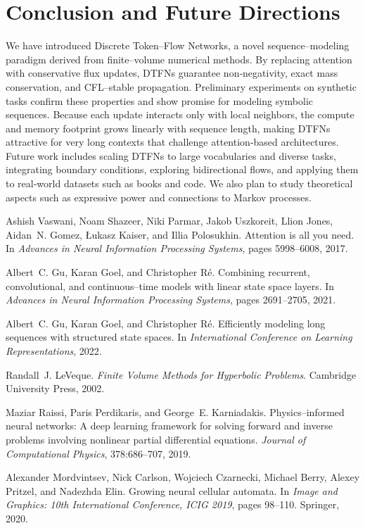 \documentclass[10pt]{article}
\begin{document}
\section{Conclusion and Future Directions}
We have introduced Discrete Token–Flow Networks, a novel sequence–modeling
paradigm derived from finite–volume numerical methods. By replacing attention
with conservative flux updates, DTFNs guarantee non‑negativity, exact mass
conservation, and CFL–stable propagation. Preliminary experiments on synthetic
tasks confirm these properties and show promise for modeling symbolic
sequences. Because each update interacts only with local neighbors, the
compute and memory footprint grows linearly with sequence length, making
DTFNs attractive for very long contexts that challenge attention‑based
architectures. Future work includes scaling DTFNs to large vocabularies
and diverse tasks, integrating boundary conditions, exploring bidirectional
flows, and applying them to real‑world datasets such as books and code.
We also plan to study theoretical aspects such as expressive power and
connections to Markov processes.


\begin{thebibliography}{10}

Ashish Vaswani, Noam Shazeer, Niki Parmar, Jakob Uszkoreit, Llion Jones,
Aidan~N. Gomez, \L{}ukasz Kaiser, and Illia Polosukhin.
\newblock Attention is all you need.
\newblock In \emph{Advances in Neural Information Processing Systems}, pages
  5998--6008, 2017.

Albert~C. Gu, Karan Goel, and Christopher R{\'e}.
\newblock Combining recurrent, convolutional, and continuous--time models with
  linear state space layers.
\newblock In \emph{Advances in Neural Information Processing Systems}, pages
  2691--2705, 2021.

Albert~C. Gu, Karan Goel, and Christopher R{\'e}.
\newblock Efficiently modeling long sequences with structured state spaces.
\newblock In \emph{International Conference on Learning Representations}, 2022.

Randall~J. LeVeque.
\newblock \emph{Finite Volume Methods for Hyperbolic Problems}.
\newblock Cambridge University Press, 2002.

Maziar Raissi, Paris Perdikaris, and George~E. Karniadakis.
\newblock Physics--informed neural networks: A deep learning framework for
  solving forward and inverse problems involving nonlinear partial
  differential equations.
\newblock \emph{Journal of Computational Physics}, 378:686--707, 2019.

Alexander Mordvintsev, Nick Carlson, Wojciech Czarnecki, Michael Berry,
  Alexey Pritzel, and Nadezhda Elin.
\newblock Growing neural cellular automata.
\newblock In \emph{Image and Graphics: 10th International Conference, ICIG
  2019}, pages 98--110. Springer, 2020.

\end{thebibliography}
\end{document}
